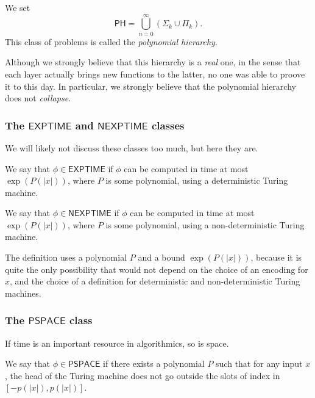 \begin{definition}
    We set
    \[
        \mathsf{PH} = \bigcup_{n=0}^\infty (\mathsf \Sigma_k \cup \mathsf \Pi_k).
    \]
    This class of problems is called the \textit{polynomial hierarchy}.
\end{definition}

Although we strongly believe that this hierarchy is a \textit{real} one, in the sense that each \og layer \fg actually brings new functions to the latter, no one was able to proove it to this day. In particular, we strongly believe that the polynomial hierarchy does not \textit{collapse}.

\subsubsection{The $ \mathsf{EXPTIME} $ and $ \mathsf{NEXPTIME} $ classes}

We will likely not discuss these classes too much, but here they are.

\begin{definition}
    We say that $ \phi \in \mathsf{EXPTIME} $ if $ \phi $ can be computed in time at most $ \exp(P(|x|)) $, where $ P $ is some polynomial, using a deterministic Turing machine.

    We say that $ \phi \in \mathsf{NEXPTIME} $ if $ \phi $ can be computed in time at most $ \exp(P(|x|)) $, where $ P $ is some polynomial, using a non-deterministic Turing machine.
\end{definition}

The definition uses a polynomial $ P $ and a bound $ \exp(P(|x|)) $, because it is quite the only possibility that would not depend on the choice of an encoding for $ x $, and the choice of a definition for deterministic and non-deterministic Turing machines.

\subsubsection{The $ \mathsf{PSPACE} $ class}

If time is an important resource in algorithmics, so is space.

\begin{definition}
    We say that $ \phi \in \mathsf{PSPACE} $ if there exists a polynomial $ P $ such that for any input $ x $, the head of the Turing machine does not go outside the slots of index in $ [-p(|x|),p(|x|)] $.
\end{definition}

